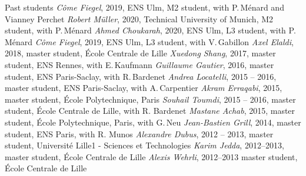 \documentclass{resume}
\begin{document}
\begin{category}{Past students}
\citembullet  \emph{C\^{o}me Fiegel}, 2019, ENS Ulm, M2 student, with P.\,M\'enard and Vianney Perchet
\citembullet  \emph{Robert M\"uller}, 2020, Technical University of Munich, M2 student, with P.\,M\'enard
\citembullet  \emph{Ahmed Choukarah}, 2020, ENS Ulm, L3 student, with P.\,M\'enard
\citembullet  \emph{C\^{o}me Fiegel}, 2019, ENS Ulm, L3 student, with V.\,Gabillon
\citembullet \textit{Axel Elaldi}, 2018, master student, 
\'Ecole Centrale de Lille
\citembullet \textit{Xuedong Shang}, 2017, master student, 
ENS Rennes, with E.\,Kaufmann
\citembullet \textit{Guillaume Gautier}, 2016, master student, 
ENS Paris-Saclay, with R.\,Bardenet
\citembullet \textit{Andrea Locatelli}, 2015 -- 2016, master student,
ENS Paris-Saclay, with A.\,Carpentier 
\citembullet \textit{Akram Erraqabi}, 2015, master student,
\'Ecole Polytechnique, Paris 
\citembullet \textit{Souhail Toumdi}, 2015 -- 2016, master student, \'Ecole
Centrale de Lille,  with R. Bardenet
\citembullet \textit{Mastane Achab}, 2015, master student,
\'Ecole Polytechnique, Paris, with G.\,Neu
\citembullet \textit{Jean-Bastien Grill}, 2014, master student,
ENS Paris, with R. Munos
\citembullet \textit{Alexandre Dubus}, 2012 -- 2013, master student, Universit\'e
Lille1 -
Sciences et Technologies
\citembullet \textit{Karim Jedda},  2012--2013, master student, \'Ecole
Centrale de Lille
  \citembullet \textit{Alexis Wehrli}, 2012--2013 master student, \'Ecole
Centrale de Lille
\end{category}
\end{document}
